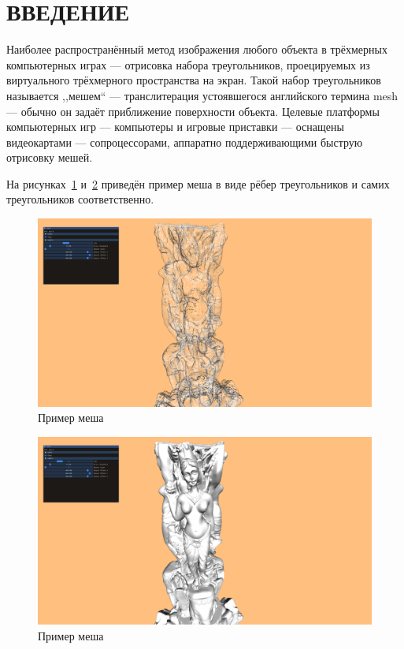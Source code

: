 \clearpage
\section{ВВЕДЕНИЕ}
Наиболее распространённый метод изображения любого объекта в трёхмерных компьютерных играх --- отрисовка набора треугольников, проецируемых из виртуального трёхмерного пространства на экран.
Такой набор треугольников называется ,,мешем`` --- транслитерация устоявшегося английского термина mesh --- обычно он задаёт приближение поверхности объекта.
Целевые платформы компьютерных игр --- компьютеры и игровые приставки --- оснащены видеокартами --- сопроцессорами, аппаратно поддерживающими быструю отрисовку мешей.

На рисунках~\ref{fig:mesh-example-wireframe} и~\ref{fig:mesh-example-solid} приведён пример меша в виде рёбер треугольников и самих треугольников соответственно.

\begin{figure}[H]
    \centering
    \includegraphics[width=\textwidth]{pics/mesh-example-wireframe.png}
    \caption{Пример меша}
    \label{fig:mesh-example-wireframe}
\end{figure}

\begin{figure}[H]
    \centering
    \includegraphics[width=\textwidth]{pics/mesh-example-solid.png}
    \caption{Пример меша}
    \label{fig:mesh-example-solid}
\end{figure}

